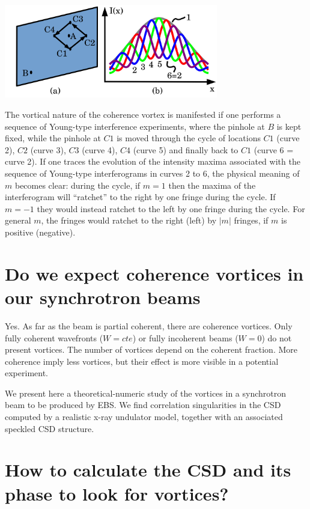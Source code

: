 \documentclass[a4paper,10pt]{article}
\begin{document}
\includegraphics[width=0.7\textwidth]{Figures/Anholonomy.png}

 
The vortical nature of the coherence vortex is manifested if one performs a sequence of Young-type interference experiments, where the pinhole at $B$ is kept fixed, while the pinhole at $C1$ is moved through the cycle of locations $C1$ (curve 2), $C2$ (curve 3), $C3$ (curve 4), $C4$ (curve 5) and finally back to $C1$ (curve 6 = curve 2). If one traces the evolution of the intensity maxima associated with the sequence of Young-type interferograms in curves 2 to 6, the physical meaning of $m$ becomes clear: during the cycle, if $m=1$ then the maxima of the interferogram will ``ratchet'' to the right by one fringe during the cycle. If $m=-1$ they would instead ratchet to the left by one fringe during the cycle.  For general $m$, the fringes would ratchet to the right (left) by $|m|$ fringes, if $m$ is positive (negative).
 
 
\section{Do we expect coherence vortices in our synchrotron beams}

Yes. As far as the beam is partial coherent, there are coherence vortices. Only fully coherent wavefronts ($W=cte$) or fully incoherent beams ($W=0$) do not present vortices. The number of vortices depend on the coherent fraction. More coherence imply less vortices, but their effect is more visible in a potential experiment. 

We present here a theoretical-numeric study  of the vortices in a synchrotron beam to be produced by EBS. We find correlation singularities in the CSD computed by a realistic x-ray undulator model, together with an associated speckled CSD structure.


\section{How to calculate the CSD and its phase to look for vortices?}
\end{document}
